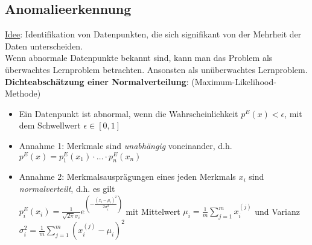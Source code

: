 \subsection{Anomalieerkennung}
\label{anomalieerkennung}
\underline{Idee}: Identifikation von Datenpunkten, die sich signifikant von der Mehrheit der Daten unterscheiden.\\

Wenn abnormale Datenpunkte bekannt sind, kann man das Problem als überwachtes Lernproblem betrachten. Ansonsten als unüberwachtes Lernproblem.\\

\textbf{Dichteabschätzung einer Normalverteilung}: (Maximum-Likelihood-Methode)
\begin{itemize}
    \item Ein Datenpunkt ist abnormal, wenn die Wahrscheinlichkeit $p^E(x)<\epsilon$, mit dem Schwellwert $\epsilon\in [0,1]$
    \item Annahme 1: Merkmale sind \emph{unabhängig} voneinander, d.h. $p^E(x)=p^E_1(x_1)\cdot \ldots  \cdot p^E_n(x_n)$
    \item Annahme 2: Merkmalsausprägungen eines jeden Merkmals $x_i$ sind \emph{normalverteilt}, d.h. es gilt \\$p^E_i(x_i)=\frac{1}{\sqrt{2\pi}\sigma_i}e^{\left(-\frac{(x_i-\mu_i)^2}{2\sigma_i^2}\right)}$ mit Mittelwert $\mu_i=\frac{1}{m}\sum_{j=1}^{m}x_i^{(j)}$ und Varianz $\sigma_i^2=\frac{1}{m}\sum_{j=1}^{m}(x_i^{(j)}-\mu_i)^2$
\end{itemize}